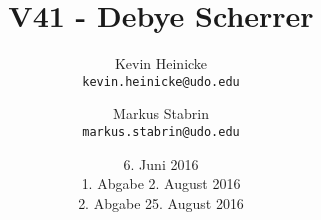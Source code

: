 


\title{%
    V41 - Debye Scherrer
}
\author{%
    Kevin Heinicke\\
    \texttt{kevin.heinicke@udo.edu}
    \and
    Markus Stabrin\\
    \texttt{markus.stabrin@udo.edu}
}
\date{%
    6. Juni 2016\\
    {\small 1. Abgabe} 2. August 2016\\
    {\small 2. Abgabe} 25. August 2016\\
}

    \maketitle%
    \tableofcontents
    \newpage
    
    

    \printbibliography
    

